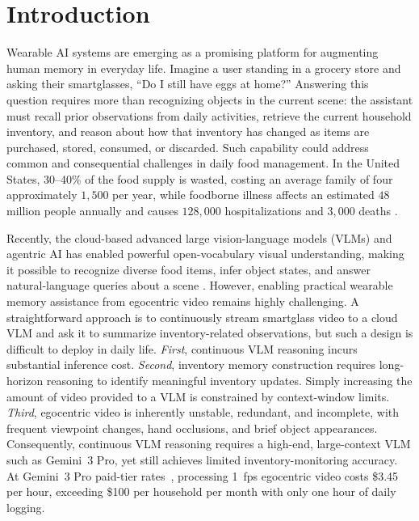 \section{Introduction}
Wearable AI systems are emerging as a promising platform for augmenting human memory in everyday life. 
%
Imagine a user standing in a grocery store and asking their smartglasses, “Do I still have eggs at home?” 
%
Answering this question requires more than recognizing objects in the current scene: the assistant must recall prior observations from daily activities, retrieve the current household inventory, and reason about how that inventory has changed as items are purchased, stored, consumed, or discarded. 
%
Such capability could address common and consequential challenges in daily food management. 
%
In the United States, 30–40\% of the food supply is wasted, costing an average family of four approximately $1,500$ per year, while foodborne illness affects an estimated $48$ million people annually and causes $128,000$ hospitalizations and $3,000$ deaths \cite{}.

Recently, the cloud-based advanced large vision-language models (VLMs) and agentric AI has enabled powerful open-vocabulary visual understanding, making it possible to recognize diverse food items, infer object states, and answer natural-language queries about a scene \cite{tateno2025learning, zameni2025moscato,ukai2025status}.
%
However, enabling practical wearable memory assistance from egocentric video remains highly challenging.
%
A straightforward approach is to continuously stream smartglass video to a cloud VLM and ask it to summarize inventory-related observations, but such a design is difficult to deploy in daily life.
%
\emph{First}, continuous VLM reasoning incurs substantial inference cost.
%
\emph{Second}, inventory memory construction requires long-horizon reasoning to identify meaningful inventory updates.
%
Simply increasing the amount of video provided to a VLM is constrained by context-window limits.
%
\emph{Third}, egocentric video is inherently unstable, redundant, and incomplete, with frequent viewpoint changes, hand occlusions, and brief object appearances.
%
Consequently, continuous VLM reasoning requires a high-end, large-context VLM such as Gemini~3 Pro, yet still achieves limited inventory-monitoring accuracy.
%
At Gemini~3 Pro paid-tier rates~\cite{googleGeminiAPIPricing2026}, processing 1~fps egocentric video costs \$3.45 per hour, exceeding \$100 per household per month with only one hour of daily logging.


